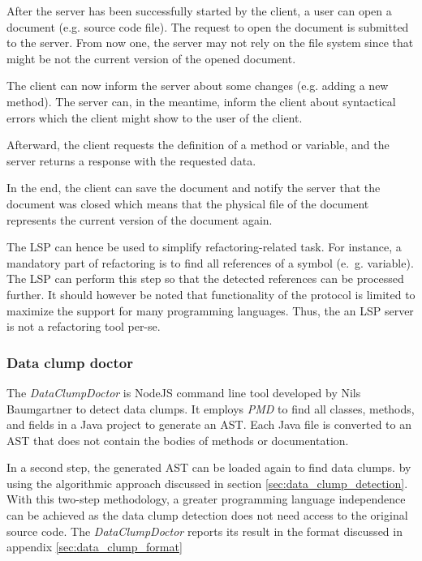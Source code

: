 After the server has been successfully started by the client, a user can open a document (e.g. source code file). The request to open the document is submitted to the server. From now one, the server may not rely on the file system since that might be not the current version of the opened document. 

The client can now inform the server about some changes (e.g. adding a new method). The server can, in the meantime, inform the client about syntactical errors which the client might show to the user of the client.

Afterward, the client requests the definition of a method or variable, and the server returns a response with the requested data.

In the end, the client can save the document and notify the server that the document was closed which means that the physical file of the document represents the current version of the document again. 

The \ac{LSP} can hence be used to simplify refactoring-related task. For instance, a mandatory part of refactoring is to find all references of a symbol (e.~g. variable). The \ac{LSP} can perform this step so that the detected references can be processed further. It should however be noted that functionality of the protocol is limited to maximize the support for many programming languages. Thus, the an \ac{LSP} server is not a refactoring tool per-se. 





\subsubsection{Data clump doctor} \label{sec:data_clump_doctor}

The  \textit{DataClumpDoctor} is NodeJS command line tool developed by Nils Baumgartner  to detect data clumps. It employs \textit{PMD} to find all classes, methods, and fields in a Java project to generate an \ac{AST}. Each Java file is converted to an \ac{AST} that does not contain the bodies of methods or documentation.

In a second step, the generated \ac{AST} can be loaded again to find data clumps. by using the algorithmic approach discussed in section \ref{sec:data_clump_detection}. With this two-step methodology, a greater programming language independence can be achieved as the data clump detection does not need access to the original source code. The \textit{DataClumpDoctor} reports its result in the format discussed in appendix \ref{sec:data_clump_format}

